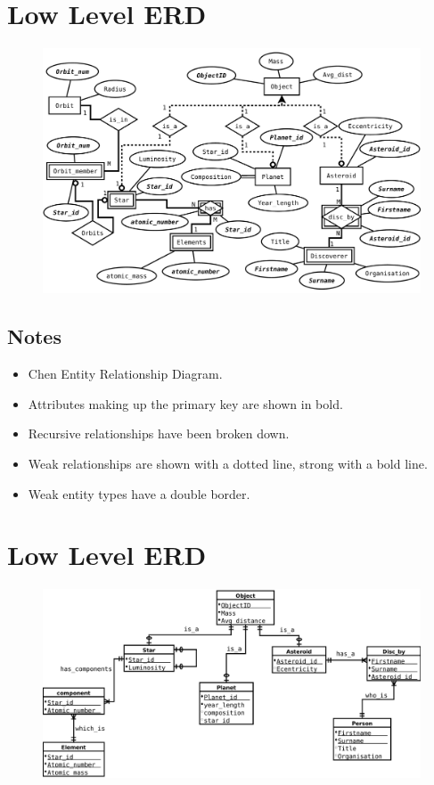 \documentclass[11pt]{article} %
\begin{document}


\newpage
\section{Low Level ERD}
\label{sec:low_level_erd}

\begin{figure}[h]
	\centering
	\includegraphics[width=1.0\textwidth]{ERD-low-Chen.pdf}
\end{figure}

\subsection{Notes}
\label{sub:notes}

\begin{itemize}
	\item Chen Entity Relationship Diagram.
	\item Attributes making up the primary key are shown in bold.
	\item Recursive relationships have been broken down.
	\item Weak relationships are shown with a dotted line, strong with a bold
		line.
	\item Weak entity types have a double border.
\end{itemize}



\newpage
\section{Low Level ERD}
\label{sec:low_level_erd}

\begin{figure}[h]
	\centering
	\includegraphics[width=1.0\textwidth]{ERD-low-CF.pdf}
\end{figure}

\end{document}
